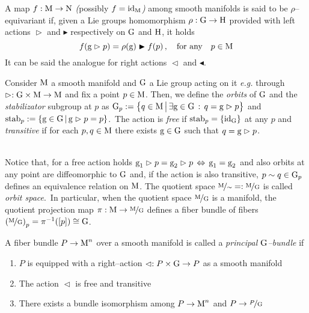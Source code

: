 \begin{defi}
    A map $f:\text{\normalfont M}\to\text{\normalfont{N}}$ \emph{(}possibly $f=\text{\normalfont id}_{\text{\normalfont M}}$\emph{)} among smooth manifolds is said to be $\rho$--equivariant if, given a Lie groups homomorphism $\rho:\text{\normalfont G}\to\text{\normalfont H}$ provided with left actions $\vartriangleright$ and $\blacktriangleright$ respectively on $\text{\normalfont G}$ and $\text{\normalfont H}$, it holds $$f(\text{\normalfont g}\vartriangleright p)=\rho(\text{\normalfont g})\blacktriangleright f( p)\,,\quad\text{for any}\quad p\in\text{\normalfont M}$$
    It can be said the analogue for right actions $\vartriangleleft$ and $\blacktriangleleft$.
\end{defi}
\begin{defi}
    Consider $\text{\normalfont M}$ a smooth manifold and $\text{\normalfont G}$ a Lie group acting on it \emph{e.g.} through $\vartriangleright:\text{\normalfont G}\times\text{\normalfont M}\to\text{\normalfont M}$ and fix a point $p\in\text{\normalfont M}$. Then, we define the \emph{orbits} of $\text{\normalfont G}$ and the \emph{stabilizator} subgroup at $p$ as $\text{\normalfont G}_p:=\big\{q\in\text{\normalfont M}\,\big|\,\exists\text{\normalfont g}\in\text{\normalfont G}\,:\,q=\text{\normalfont g}\vartriangleright p\big\}$ and $\normalfont{\text{stab}}_p:=\{\text{\normalfont g}\in\text{\normalfont G}\,|\,\text{\normalfont g}\vartriangleright p=p\}$.\, The action is \emph{free} if $\normalfont{\text{stab}}_p=\{\text{\normalfont id}_{\text{\normalfont G}}\}$ at any $p$ and \emph{transitive} if for each $p,q\in\text{\normalfont M}$ there exists $\text{\normalfont g}\in\text{\normalfont G}$ such that $q=\text{\normalfont g}\vartriangleright p$.
\end{defi}
\,\\
Notice that, for a free action holds $\text{\normalfont g}_1\vartriangleright p=\text{\normalfont g}_2\vartriangleright p\,\Leftrightarrow\,\text{\normalfont g}_1=\text{\normalfont g}_2$ and also orbits at any point are diffeomorphic to $\text{\normalfont G}$ and, if the action is also transitive, 
$p\sim q\in\text{\normalfont G}_p$ defines an equivalence relation on $\text{\normalfont M}$. The quotient space $\nicefrac{\text{\normalfont M}}{\sim}=:\nicefrac{\text{\normalfont M}}{\text{\normalfont G}}$ is called \emph{orbit space}.\, In particular, when the quotient space $\nicefrac{\text{\normalfont M}}{\text{\normalfont G}}$ is a manifold, the quotient projection map $\pi:\text{\normalfont M}\to\nicefrac{\text{\normalfont M}}{\text{\normalfont G}}$ defines a fiber bundle of fibers $\left(\nicefrac{\text{\normalfont M}}{\text{\normalfont G}}\right)_p=\pi^{-1}([p])\cong\text{\normalfont G}$.

\begin{defi}
    A fiber bundle $P\to\text{\normalfont M}^n$ over a smooth manifold is called a \emph{principal $\text{\normalfont G}$--bundle} if
    \begin{enumerate}
        \item $P$ is equipped with a right--action $\vartriangleleft:P\times\text{\normalfont G}\to P$ as a smooth manifold
        \item The action $\vartriangleleft$ is free and transitive
        \item There exists a bundle isomorphism among $P\to\text{\normalfont M}^n$ and $P\to\nicefrac{P}{\text{\normalfont G}}$
    \end{enumerate}
\end{defi}

